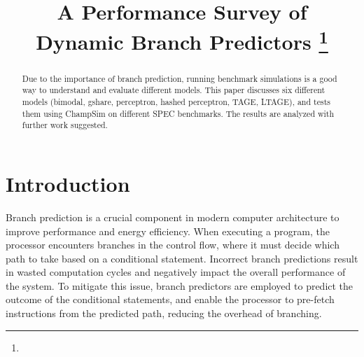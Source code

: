 \documentclass[conference]{IEEEtran}
\begin{document}
\title{A Performance Survey of \\Dynamic Branch Predictors
\thanks{}
}
\author{
\and
{}
\and
{}
\and
{}
\and
{}
}

\maketitle

\begin{abstract}
    Due to the importance of branch prediction, running benchmark simulations is a good way to understand and evaluate different models. This paper discusses six different models (bimodal, gshare, perceptron, hashed perceptron, TAGE, LTAGE), and tests them using ChampSim on different SPEC benchmarks. The results are analyzed with further work suggested.
\end{abstract}

\section{Introduction} \label{sec:introduction}
Branch prediction is a crucial component in modern computer architecture to improve performance and energy efficiency. When executing a program, the processor encounters branches in the control flow, where it must decide which path to take based on a conditional statement. Incorrect branch predictions result in wasted computation cycles and negatively impact the overall performance of the system. To mitigate this issue, branch predictors are employed to predict the outcome of the conditional statements, and enable the processor to pre-fetch instructions from the predicted path, reducing the overhead of branching.
\end{document}
